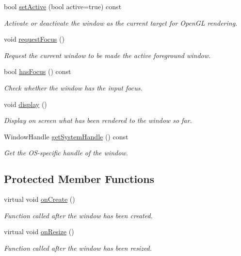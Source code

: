 \begin{DoxyCompactItemize}
bool \mbox{\hyperlink{classsf_1_1_window_aaab549da64cedf74fa6f1ae7a3cc79e0}{set\+Active}} (bool active=true) const
\begin{DoxyCompactList}\small\item\em Activate or deactivate the window as the current target for Open\+GL rendering. \end{DoxyCompactList}\item 
void \mbox{\hyperlink{classsf_1_1_window_a58cf7fa1775e8e7542032e3ecfa83b49}{request\+Focus}} ()
\begin{DoxyCompactList}\small\item\em Request the current window to be made the active foreground window. \end{DoxyCompactList}\item 
bool \mbox{\hyperlink{classsf_1_1_window_ad8db2e6500d13ca9396281296404ba31}{has\+Focus}} () const
\begin{DoxyCompactList}\small\item\em Check whether the window has the input focus. \end{DoxyCompactList}\item 
void \mbox{\hyperlink{classsf_1_1_window_adabf839cb103ac96cfc82f781638772a}{display}} ()
\begin{DoxyCompactList}\small\item\em Display on screen what has been rendered to the window so far. \end{DoxyCompactList}\item 
Window\+Handle \mbox{\hyperlink{classsf_1_1_window_ad2fa6be5104ec0bfe79af7a5f524ea90}{get\+System\+Handle}} () const
\begin{DoxyCompactList}\small\item\em Get the O\+S-\/specific handle of the window. \end{DoxyCompactList}\end{DoxyCompactItemize}
\subsection*{Protected Member Functions}
\begin{DoxyCompactItemize}
\item 
virtual void \mbox{\hyperlink{classsf_1_1_window_a106633b9be49b27f83d4712689b493eb}{on\+Create}} ()
\begin{DoxyCompactList}\small\item\em Function called after the window has been created. \end{DoxyCompactList}\item 
virtual void \mbox{\hyperlink{classsf_1_1_window_a10f567a387da7b49f417f73321fcf64d}{on\+Resize}} ()
\begin{DoxyCompactList}\small\item\em Function called after the window has been resized. \end{DoxyCompactList}\end{DoxyCompactItemize}
